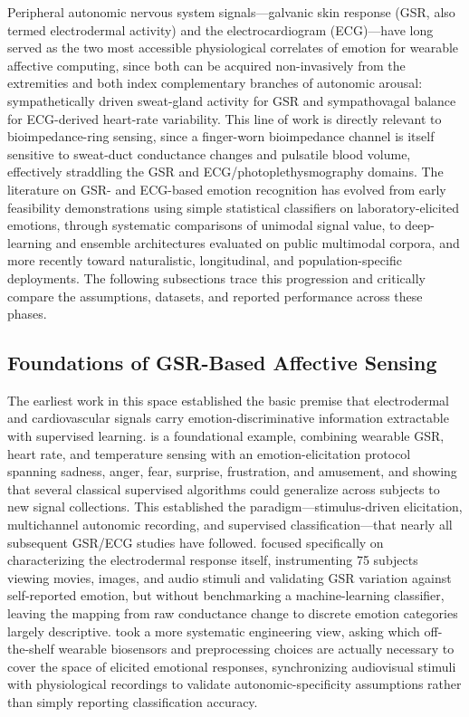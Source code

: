 Peripheral autonomic nervous system signals---galvanic skin response (GSR, also termed electrodermal activity) and the electrocardiogram (ECG)---have long served as the two most accessible physiological correlates of emotion for wearable affective computing, since both can be acquired non-invasively from the extremities and both index complementary branches of autonomic arousal: sympathetically driven sweat-gland activity for GSR and sympathovagal balance for ECG-derived heart-rate variability. This line of work is directly relevant to bioimpedance-ring sensing, since a finger-worn bioimpedance channel is itself sensitive to sweat-duct conductance changes and pulsatile blood volume, effectively straddling the GSR and ECG/photoplethysmography domains. The literature on GSR- and ECG-based emotion recognition has evolved from early feasibility demonstrations using simple statistical classifiers on laboratory-elicited emotions, through systematic comparisons of unimodal signal value, to deep-learning and ensemble architectures evaluated on public multimodal corpora, and more recently toward naturalistic, longitudinal, and population-specific deployments. The following subsections trace this progression and critically compare the assumptions, datasets, and reported performance across these phases.

\subsection{Foundations of GSR-Based Affective Sensing}
The earliest work in this space established the basic premise that electrodermal and cardiovascular signals carry emotion-discriminative information extractable with supervised learning. \cite{lisetti2004noninvasive} is a foundational example, combining wearable GSR, heart rate, and temperature sensing with an emotion-elicitation protocol spanning sadness, anger, fear, surprise, frustration, and amusement, and showing that several classical supervised algorithms could generalize across subjects to new signal collections. This established the paradigm---stimulus-driven elicitation, multichannel autonomic recording, and supervised classification---that nearly all subsequent GSR/ECG studies have followed. \cite{vijaya2013galvanic} focused specifically on characterizing the electrodermal response itself, instrumenting 75 subjects viewing movies, images, and audio stimuli and validating GSR variation against self-reported emotion, but without benchmarking a machine-learning classifier, leaving the mapping from raw conductance change to discrete emotion categories largely descriptive. \cite{hui2018coverage} took a more systematic engineering view, asking which off-the-shelf wearable biosensors and preprocessing choices are actually necessary to cover the space of elicited emotional responses, synchronizing audiovisual stimuli with physiological recordings to validate autonomic-specificity assumptions rather than simply reporting classification accuracy.

